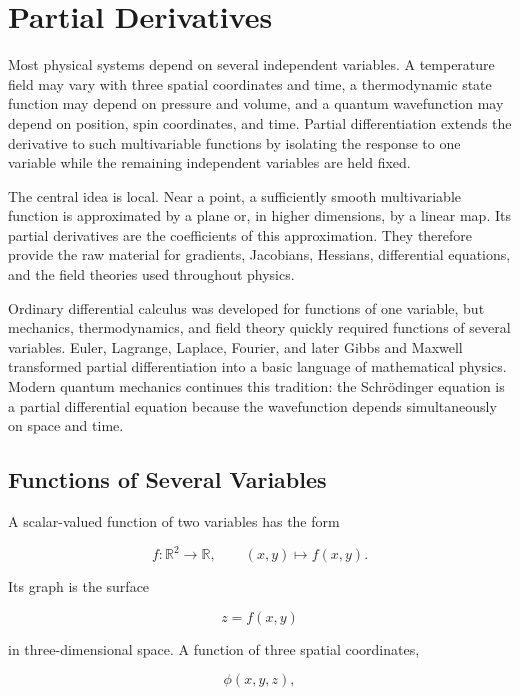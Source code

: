 \section{Partial Derivatives}
\label{sec:partial-derivatives}

Most physical systems depend on several independent variables. A temperature field may vary with three spatial coordinates and time, a thermodynamic state function may depend on pressure and volume, and a quantum wavefunction may depend on position, spin coordinates, and time. Partial differentiation extends the derivative to such multivariable functions by isolating the response to one variable while the remaining independent variables are held fixed.

The central idea is local. Near a point, a sufficiently smooth multivariable function is approximated by a plane or, in higher dimensions, by a linear map. Its partial derivatives are the coefficients of this approximation. They therefore provide the raw material for gradients, Jacobians, Hessians, differential equations, and the field theories used throughout physics.

\begin{bookhistory}
Ordinary differential calculus was developed for functions of one variable, but mechanics, thermodynamics, and field theory quickly required functions of several variables. Euler, Lagrange, Laplace, Fourier, and later Gibbs and Maxwell transformed partial differentiation into a basic language of mathematical physics. Modern quantum mechanics continues this tradition: the Schr\"odinger equation is a partial differential equation because the wavefunction depends simultaneously on space and time.
\end{bookhistory}

\subsection{Functions of Several Variables}

A scalar-valued function of two variables has the form

\[
f:\mathbb{R}^2\rightarrow\mathbb{R},
\qquad
(x,y)\mapsto f(x,y).
\]

Its graph is the surface

\[
z=f(x,y)
\]

in three-dimensional space. A function of three spatial coordinates,

\[
\phi(x,y,z),
\]

